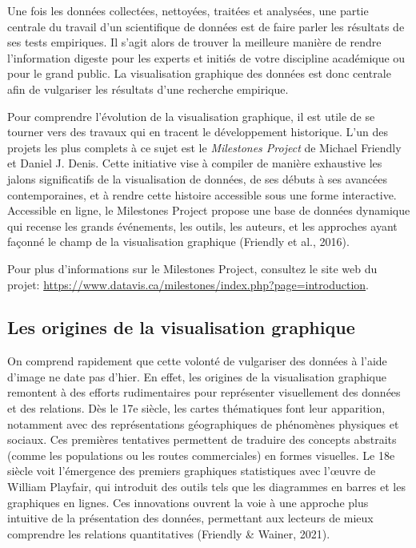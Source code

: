 \documentclass[
  letterpaper,
  DIV=11,
  numbers=noendperiod]{scrreprt}
\begin{document}
Une fois les données collectées, nettoyées, traitées et analysées, une
partie centrale du travail d'un scientifique de données est de faire
parler les résultats de ses tests empiriques. Il s'agit alors de trouver
la meilleure manière de rendre l'information digeste pour les experts et
initiés de votre discipline académique ou pour le grand public. La
visualisation graphique des données est donc centrale afin de vulgariser
les résultats d'une recherche empirique.

Pour comprendre l'évolution de la visualisation graphique, il est utile
de se tourner vers des travaux qui en tracent le développement
historique. L'un des projets les plus complets à ce sujet est le
\emph{Milestones Project} de Michael Friendly et Daniel J. Denis. Cette
initiative vise à compiler de manière exhaustive les jalons
significatifs de la visualisation de données, de ses débuts à ses
avancées contemporaines, et à rendre cette histoire accessible sous une
forme interactive. Accessible en ligne, le Milestones Project propose
une base de données dynamique qui recense les grands événements, les
outils, les auteurs, et les approches ayant façonné le champ de la
visualisation graphique (Friendly et al., 2016).

\begin{tcolorbox}[enhanced jigsaw, opacitybacktitle=0.6, breakable, left=2mm, titlerule=0mm, arc=.35mm, bottomrule=.15mm, rightrule=.15mm, opacityback=0, toprule=.15mm, bottomtitle=1mm, coltitle=black, colframe=quarto-callout-note-color-frame, colback=white, title=\textcolor{quarto-callout-note-color}{\faInfo}\hspace{0.5em}{Note}, toptitle=1mm, colbacktitle=quarto-callout-note-color!10!white, leftrule=.75mm]

Pour plus d'informations sur le Milestones Project, consultez le site
web du projet:
\url{https://www.datavis.ca/milestones/index.php?page=introduction}.

\end{tcolorbox}

\subsection{Les origines de la visualisation
graphique}\label{les-origines-de-la-visualisation-graphique}

On comprend rapidement que cette volonté de vulgariser des données à
l'aide d'image ne date pas d'hier. En effet, les origines de la
visualisation graphique remontent à des efforts rudimentaires pour
représenter visuellement des données et des relations. Dès le 17e
siècle, les cartes thématiques font leur apparition, notamment avec des
représentations géographiques de phénomènes physiques et sociaux. Ces
premières tentatives permettent de traduire des concepts abstraits
(comme les populations ou les routes commerciales) en formes visuelles.
Le 18e siècle voit l'émergence des premiers graphiques statistiques avec
l'œuvre de William Playfair, qui introduit des outils tels que les
diagrammes en barres et les graphiques en lignes. Ces innovations
ouvrent la voie à une approche plus intuitive de la présentation des
données, permettant aux lecteurs de mieux comprendre les relations
quantitatives (Friendly \& Wainer, 2021).
\end{document}
